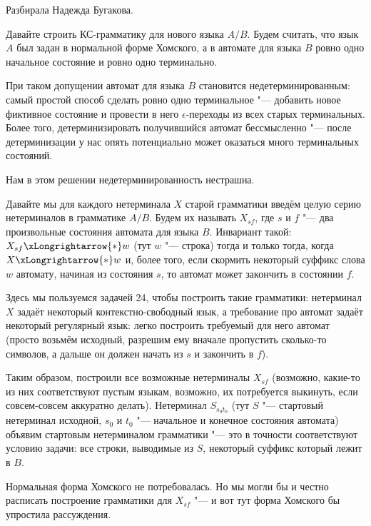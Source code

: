 	Разбирала Надежда Бугакова.

	Давайте строить КС-грамматику для нового языка $A/B$.
	Будем считать, что язык $A$ был задан в нормальной форме Хомского,
	а в автомате для языка $B$ ровно одно начальное состояние и ровно одно терминально.
	\begin{Rem}
		При таком допущении автомат для языка $B$ становится недетерминированным: самый простой способ
		сделать ровно одно терминальное "--- добавить новое фиктивное состояние и провести в него $\epsilon$-переходы из всех старых терминальных.
		Более того, детерминизировать получившийся автомат бессмысленно "--- после детерминизации у нас опять потенциально может оказаться много терминальных состояний.

		Нам в этом решении недетерминированность нестрашна.
	\end{Rem}
	Давайте мы для каждого нетерминала $X$ старой грамматики введём целую серию нетерминалов в грамматике $A/B$.
	Будем их называть $X_{sf}$, где $s$ и $f$ "--- два произвольные состояния автомата для языка $B$.
	Инвариант такой: $X_{sf}\xLongrightarrow{*} w$ (тут $w$ "--- строка) тогда и только тогда,
	когда $X \xLongrightarrow{*} w$ и, более того, если скормить некоторый суффикс слова $w$ автомату,
	начиная из состояния $s$, то автомат может закончить в состоянии $f$.

	Здесь мы пользуемся задачей 24, чтобы построить такие грамматики: нетерминал $X$ задаёт некоторый
	контекстно-свободный язык, а требование про автомат задаёт некоторый регулярный язык: легко построить
	требуемый для него автомат (просто возьмём исходный, разрешим ему вначале пропустить сколько-то символов,
	а дальше он должен начать из $s$ и закончить в $f$).

	Таким образом, построили все возможные нетерминалы $X_{sf}$ (возможно, какие-то из них соответствуют пустым языкам,
	возможно, их потребуется выкинуть, если совсем-совсем аккуратно делать).
	Нетерминал $S_{s_0t_0}$ (тут $S$ "--- стартовый нетерминал исходной, $s_0$ и $t_0$ "--- начальное и конечное состояния автомата)
	объявим стартовым нетерминалом грамматики "--- это в точности соответствуют условию задачи: все строки, выводимые из $S$,
	некоторый суффикс который лежит в $B$.

	\begin{Rem}
		Нормальная форма Хомского не потребовалась.
		Но мы могли бы и честно расписать построение грамматики для $X_{sf}$ "--- и вот тут форма Хомского бы упростила рассуждения.
	\end{Rem}

